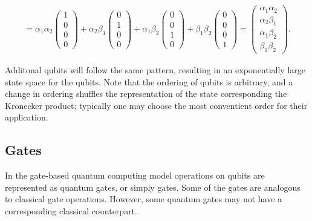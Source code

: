 \documentclass{article}
\begin{document}
\begin{multline}
= \alpha_1 \alpha_2        \begin{pmatrix}1\\0\\0\\0\end{pmatrix} 
+ \alpha_2 \beta_1           \begin{pmatrix}0\\1\\0\\0\end{pmatrix} 
+ \alpha_1 \beta_2            \begin{pmatrix}0\\0\\1\\0\end{pmatrix} 
+ \beta_1 \beta_2               \begin{pmatrix}0\\0\\0\\1\end{pmatrix} 
= \begin{pmatrix} \alpha_1 \alpha_2 \\  \alpha_2 \beta_1  \\  \alpha_1 \beta_2 \\  \beta_1 \beta_2 \end{pmatrix} 
.
\end{multline}


Additonal qubits will follow the same pattern, resulting in an exponentially large state space for the qubits. Note that the ordering of qubits is arbitrary, and a change in ordering shuffles the representation of the state corresponding the Kronecker product; typically one may choose the most conventient order for their application.


%






\subsection{Gates}

In the gate-based quantum computing model operations on qubits are represented as quantum gates, or simply gates. Some of the gates are analogous to classical gate operations. However, some quantum gates may not have a corresponding classical counterpart.
\end{document}
